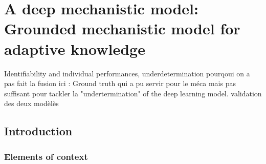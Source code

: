 
\chapter{A deep mechanistic model: Grounded mechanistic model for adaptive knowledge} %
Identifiability and individual performances, underdetermination
pourqoui on  a pas fait la fusion ici : Ground truth qui a pu servir pour le méca mais pas suffisant pour tackler la "undertermination" of the deep learning model. 
validation des deux modèlès

\section{Introduction}
\subsection{Elements of context}

